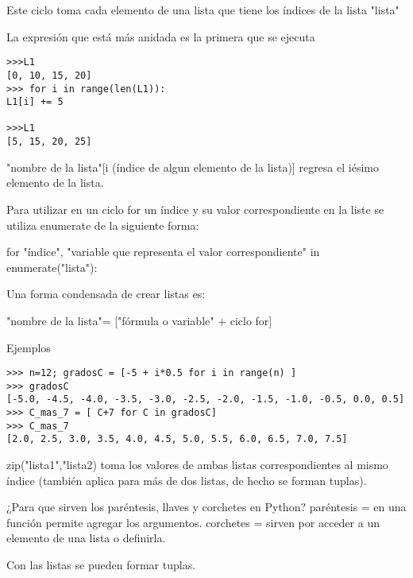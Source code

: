 \documentclass[letter paper, 12pt, oneside]{article}
\begin{document}
Este ciclo toma cada elemento de una lista que tiene los índices de la lista "lista"

La expresión que está más anidada es la primera que se ejecuta

\begin{verbatim}
>>>L1
[0, 10, 15, 20]
>>> for i in range(len(L1)):
L1[i] += 5

>>>L1
[5, 15, 20, 25]
\end{verbatim}

"nombre de la lista"[i (índice de algun elemento de la lista)] regresa el iésimo elemento de la lista. 

Para utilizar en un ciclo for un índice y su valor correspondiente en la liste se utiliza enumerate de la siguiente forma:

for "índice", "variable que representa el valor correspondiente" in enumerate("lista"):

Una forma condensada de crear listas es:

"nombre de la lista"= ["fórmula o variable" + ciclo for]

Ejemplos
\begin{verbatim}
>>> n=12; gradosC = [-5 + i*0.5 for i in range(n) ]
>>> gradosC
[-5.0, -4.5, -4.0, -3.5, -3.0, -2.5, -2.0, -1.5, -1.0, -0.5, 0.0, 0.5]
>>> C_mas_7 = [ C+7 for C in gradosC]
>>> C_mas_7
[2.0, 2.5, 3.0, 3.5, 4.0, 4.5, 5.0, 5.5, 6.0, 6.5, 7.0, 7.5]
\end{verbatim}

zip("lista1","lista2) toma los valores de ambas listas correspondientes al mismo índice (también aplica para más de dos listas, de hecho se forman tuplas).

¿Para que sirven los paréntesis, llaves y corchetes en Python?
paréntesis = en una función permite agregar los argumentos.
corchetes = sirven por acceder a un elemento de una lista o definirla.

Con las listas se pueden formar tuplas. 
\end{document}
